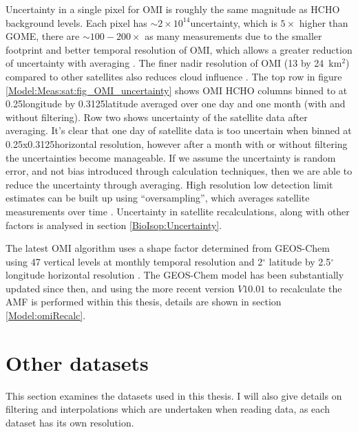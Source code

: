   Uncertainty in a single pixel for OMI is roughly the same magnitude as HCHO background levels.
  Each pixel has $\sim 2 \times 10^{14}$\moleccm uncertainty, which is $5 \times$ higher than GOME, there are $\sim 100-200 \times $ as many measurements due to the smaller footprint and better temporal resolution of OMI, which allows a greater reduction of uncertainty with averaging \parencite{Chance2002,Millet2008}.
  The finer nadir resolution of OMI (13 by 24~km${^2}$) compared to other satellites also reduces cloud influence \parencite{Millet2006, Millet2008}.
  The top row in figure \ref{Model:Meas:sat:fig_OMI_uncertainty} shows OMI HCHO columns binned to at 0.25\degr longitude by 0.3125\degr latitude averaged over one day and one month (with and without filtering).
  Row two shows uncertainty of the satellite data after averaging.
  It's clear that one day of satellite data is too uncertain when binned at 0.25x0.3125\degr horizontal resolution, however after a month with or without filtering the uncertainties become manageable.
  If we assume the uncertainty is random error, and not bias introduced through calculation techniques, then we are able to reduce the uncertainty through averaging.
  High resolution low detection limit estimates can be built up using ``oversampling'', which averages satellite measurements over time \parencite[eg.][]{Zhu2014}.
  Uncertainty in satellite recalculations, along with other factors is analysed in section \ref{BioIsop:Uncertainty}.
  
  The latest OMI algorithm uses a shape factor determined from GEOS-Chem using 47 vertical levels at monthly temporal resolution and 2$^{\circ}$ latitude by 2.5$^{\circ}$ longitude horizontal resolution \parencite{Abad2015}.
  The GEOS-Chem model has been substantially updated since then, and using the more recent version $V10.01$ to recalculate the AMF is performed within this thesis, details are shown in section \ref{Model:omiRecalc}.


\section{Other datasets}
\label{Model:Datasets}

  This section examines the datasets used in this thesis.
  I will also give details on filtering and interpolations which are undertaken when reading data, as each dataset has its own resolution.
    
